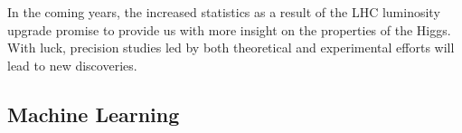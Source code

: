 \documentclass[10pt,a4paper]{book}
\begin{document}
In the coming years, the increased statistics as a result of the LHC luminosity upgrade promise to provide us with more insight on the properties of the Higgs. With luck, precision studies led by both theoretical and experimental efforts will lead to new discoveries.


\begin{appendices}
\chapter{Machine Learning}

\end{appendices}



\end{document}
